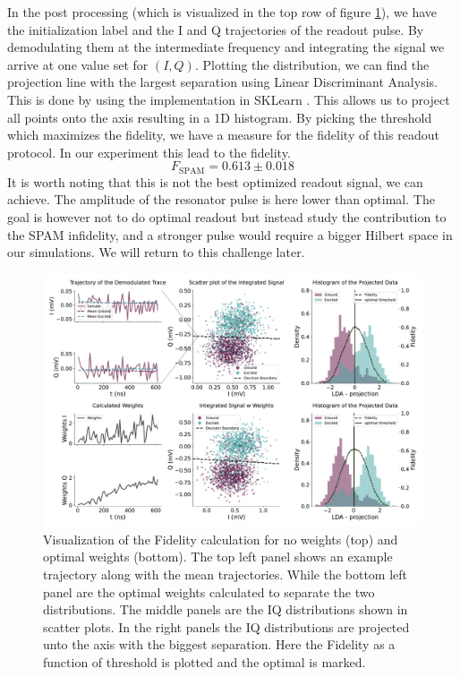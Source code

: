 In the post processing (which is visualized in the top row of figure \ref{fig:readout_process}), we have the initialization label and the I and Q trajectories of the readout pulse. By demodulating them at the intermediate frequency and integrating the signal we arrive at one value set for $(I, Q)$. Plotting the distribution, we can find the projection line with the largest separation using Linear Discriminant Analysis. This is done by using the implementation in SKLearn \cite{predregoske_sklearn}. This allows us to project all points onto the axis resulting in a 1D histogram. By picking the threshold which maximizes the fidelity, we have a measure for the fidelity of this readout protocol. In our experiment this lead to the fidelity.
\begin{equation}
    F_{\text{SPAM}} = 0.613\pm 0.018
\end{equation}
It is worth noting that this is not the best optimized readout signal, we can achieve. The amplitude of the resonator pulse is here lower than optimal. The goal is however not to do optimal readout but instead study the contribution to the SPAM infidelity, and a stronger pulse would require a bigger Hilbert space in our simulations. We will return to this challenge later.
\begin{figure}[t]
    \centering
    \includegraphics{Readout/Figs/Introduction.pdf}
    \caption{Visualization of the Fidelity calculation for no weights (top) and optimal weights (bottom). The top left panel shows an example trajectory along with the mean trajectories. While the bottom left panel are the optimal weights calculated to separate the two distributions. The middle panels are the IQ distributions shown in scatter plots. In the right panels the IQ distributions are projected unto the axis with the biggest separation. Here the Fidelity as a function of threshold is plotted and the optimal is marked.}
    \label{fig:readout_process}
\end{figure}



